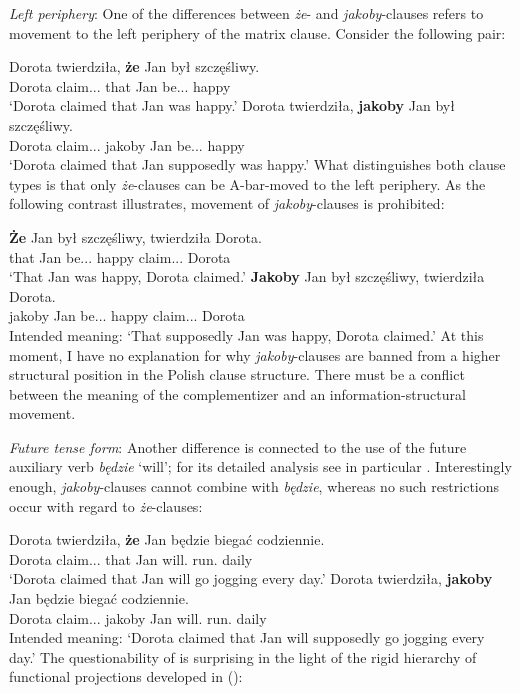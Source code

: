 \documentclass[output=paper
,modfonts
,nonflat]{langsci/langscibook}
\begin{document}
\emph{Left periphery}: One of the differences between \emph{że}- and \emph{jakoby}-clauses refers to movement to the left periphery of the matrix clause. Consider the following pair:

\ea \ea \gll	Dorota twierdziła, \textbf{że} Jan był szczęśliwy. \\  
		Dorota claim.{\lptcp}.{\sg}.{\fem} that Jan be.{\lptcp}.{\sg}.{\masc} happy \\
		\glt`Dorota claimed that Jan was happy.' 
		\ex\gll		Dorota twierdziła, \textbf{jakoby} Jan był szczęśliwy. \\  
			Dorota claim.{\lptcp}.{\sg}.{\fem} jakoby Jan be.{\lptcp}.{\sg}.{\masc} happy \\
		\glt`Dorota claimed that Jan supposedly was happy.'
\z\z
What distinguishes both clause types is that only \emph{że}-clauses can be A-bar-moved to the left periphery. As the following contrast illustrates, movement of \emph{jakoby}-clauses is prohibited:

\ea \ea \gll	\textbf{Że} Jan był szczęśliwy, twierdziła Dorota. \\  
		 that Jan be.{\lptcp}.{\sg}.{\masc} happy  claim.{\lptcp}.{\sg}.{\fem} Dorota \\
    \glt`That Jan was happy, Dorota claimed.' 
	\ex\gll		*\textbf{Jakoby} Jan był szczęśliwy, twierdziła Dorota. \\  
		 jakoby Jan be.{\lptcp}.{\sg}.{\masc} happy  claim.{\lptcp}.{\sg}.{\fem} Dorota \\
	\glt Intended meaning: `That supposedly Jan was happy, Dorota claimed.' 
    \z\z
At this moment, I have no explanation for why \emph{jakoby}-clauses are banned from a higher structural position in the Polish clause structure. There must be a conflict between the meaning of the complementizer and an information-structural movement.

\emph{Future tense form}: Another difference is connected to the use of the future auxiliary verb \emph{będzie} `will'; for its detailed analysis see in particular \textcite{Baszczak-Jabonskaetal2014}. Interestingly enough, \emph{jakoby}-clauses cannot combine with \emph{będzie}, whereas no such restrictions occur with regard to \emph{że}-clauses:

\ea \ea \gll	Dorota twierdziła, \textbf{że} Jan będzie biegać codziennie. \\
		Dorota claim.{\lptcp}.{\sg}.{\fem} that Jan will.{\thirdperson}{\sg} run.{\infv} daily \\
		\glt`Dorota claimed that Jan will go jogging every day.'
		\ex\gll	 	*Dorota twierdziła, \textbf{jakoby} Jan będzie biegać codziennie. \label{czasprzyszyl} \\
			Dorota claim.{\lptcp}.{\sg}.{\fem} jakoby Jan will.{\thirdperson}{\sg} run.{\infv} daily \\
    \glt Intended meaning: `Dorota claimed that Jan will supposedly go jogging every day.'
\z\z
The questionability of  is surprising in the light of the rigid hierarchy of functional projections developed in \citeauthor{Cinque1999} (\citeyear{Cinque1999, Cinque2006, Cinque2017}):
\end{document}
